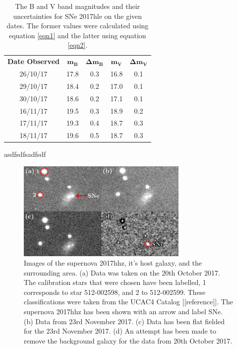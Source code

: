 \documentclass[twocolumn]{revtex4}
\begin{document}
\begin{table}[h!]
\centering
\begin{tabular}{c@{\hskip 20pt}c@{\hskip 20pt}c@{\hskip 20pt}c@{\hskip 20pt}c} 
 \hline
 \textbf{Date Observed} & \textbf{$\boldsymbol{m_B}$} & \textbf{$\boldsymbol{\Delta{m_B}}$} & \textbf{$\boldsymbol{m_V}$} & \textbf{$\boldsymbol{\Delta{m_V}}$} \\ [0.5ex] 
 26/10/17 & 17.8 & 0.3 & 16.8 & 0.1 \\
 29/10/17 & 18.4 & 0.2 & 17.0 & 0.1 \\
 30/10/17 & 18.6 & 0.2 & 17.1 & 0.1 \\
 16/11/17 & 19.5 & 0.3 & 18.9 & 0.2 \\
 17/11/17 & 19.3 & 0.4 & 18.7 & 0.3 \\
 18/11/17 & 19.6 & 0.5 & 18.7 & 0.3 \\
 \hline
\end{tabular}
\caption{The B and V band magnitudes and their uncertainties for SNe 2017hle on the given dates. The former values were calculated using equation \ref{eqn1} and the latter using equation \ref{eqn2}.}
\label{2017hle-table}
\end{table}

asdfsdfsadfsdf

\begin{figure}[!h]
\begin{center}
\includegraphics[width=8.25cm]{images/collage_rectangle_small}
\caption[]{Images of the supernova 2017hhz, it's host galaxy, and the surrounding area. (a) Data was taken on the 20th October 2017. The calibration stars that were chosen have been labelled, 1 corresponds to star 512-002598, and 2 to 512-002599. These classifications were taken from the UCAC4 Catalog [[reference]]. The supernova 2017hhz has been shown with an arrow and label SNe. (b) Data from 23rd November 2017. (c) Data has been flat fielded for the 23rd November 2017. (d) An attempt has been made to remove the background galaxy for the data from 20th October 2017.}
\label{2017hhz_collage}
\end{center}
\end{figure}
\end{document}
